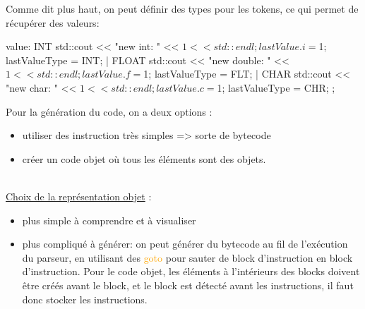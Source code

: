 \documentclass[a4paper]{article}
\begin{document}
Comme dit plus haut, on peut définir des types pour les tokens, ce qui permet de
récupérer des valeurs:

\begin{code}[language=c++]
value: INT {
       std::cout << "new int: " << $1 << std::endl;
       lastValue.i = $1;
       lastValueType = INT;
     } | FLOAT {
       std::cout << "new double: " << $1 << std::endl;
       lastValue.f = $1;
       lastValueType = FLT;
     } | CHAR {
       std::cout << "new char: " << $1 << std::endl;
       lastValue.c = $1;
       lastValueType = CHR;
     }
     ;
\end{code}\leavevmode\newline

Pour la génération du code, on a deux options :
\begin{itemize}
\item utiliser des instruction très simples => sorte de bytecode
\item créer un code objet où tous les éléments sont des objets.
\end{itemize}\leavevmode\\

\underline{Choix de la représentation objet} :
\begin{itemize}
\item plus simple à comprendre et à visualiser
\item plus compliqué à générer: on peut générer du bytecode au fil de l'exécution du parseur, en utilisant des \textcolor{orange}{goto} pour sauter de block d'instruction en block d'instruction. Pour le code objet, les éléments à l'intérieurs des blocks doivent être créés avant le block, et le block est détecté avant les instructions, il faut donc stocker les instructions.
\end{itemize}


\clearpage{}

\printbibliography[keyword={paper},title={Biliographie}]
\printbibliography[keyword={web},title={Webographie}]
\end{document}
